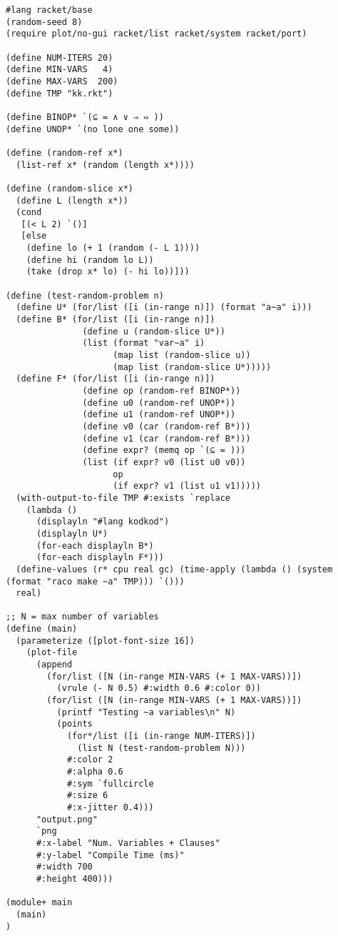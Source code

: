 \begin{lstlisting}
#lang racket/base
(random-seed 8)
(require plot/no-gui racket/list racket/system racket/port)

(define NUM-ITERS 20)
(define MIN-VARS   4)
(define MAX-VARS  200)
(define TMP "kk.rkt")

(define BINOP* `(⊆ = ∧ ∨ ⇒ ⇔ ))
(define UNOP* `(no lone one some))

(define (random-ref x*)
  (list-ref x* (random (length x*))))

(define (random-slice x*)
  (define L (length x*))
  (cond
   [(< L 2) `()]
   [else
    (define lo (+ 1 (random (- L 1))))
    (define hi (random lo L))
    (take (drop x* lo) (- hi lo))]))

(define (test-random-problem n)
  (define U* (for/list ([i (in-range n)]) (format "a~a" i)))
  (define B* (for/list ([i (in-range n)])
               (define u (random-slice U*))
               (list (format "var~a" i)
                     (map list (random-slice u))
                     (map list (random-slice U*)))))
  (define F* (for/list ([i (in-range n)])
               (define op (random-ref BINOP*))
               (define u0 (random-ref UNOP*))
               (define u1 (random-ref UNOP*))
               (define v0 (car (random-ref B*)))
               (define v1 (car (random-ref B*)))
               (define expr? (memq op `(⊆ = )))
               (list (if expr? v0 (list u0 v0))
                     op
                     (if expr? v1 (list u1 v1)))))
  (with-output-to-file TMP #:exists `replace
    (lambda ()
      (displayln "#lang kodkod")
      (displayln U*)
      (for-each displayln B*)
      (for-each displayln F*)))
  (define-values (r* cpu real gc) (time-apply (lambda () (system (format "raco make ~a" TMP))) `()))
  real)

;; N = max number of variables
(define (main)
  (parameterize ([plot-font-size 16])
    (plot-file
      (append
        (for/list ([N (in-range MIN-VARS (+ 1 MAX-VARS))])
          (vrule (- N 0.5) #:width 0.6 #:color 0))
        (for/list ([N (in-range MIN-VARS (+ 1 MAX-VARS))])
          (printf "Testing ~a variables\n" N)
          (points
            (for*/list ([i (in-range NUM-ITERS)])
              (list N (test-random-problem N)))
            #:color 2
            #:alpha 0.6
            #:sym `fullcircle
            #:size 6
            #:x-jitter 0.4)))
      "output.png"
      `png
      #:x-label "Num. Variables + Clauses"
      #:y-label "Compile Time (ms)"
      #:width 700
      #:height 400)))

(module+ main
  (main)
)
\end{lstlisting}
